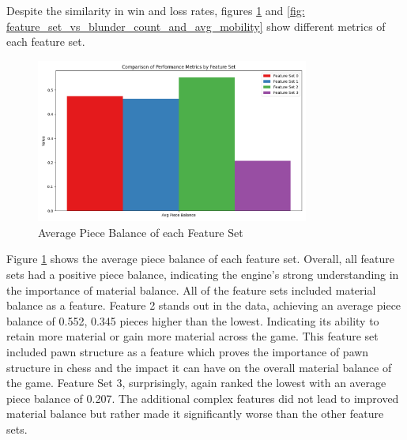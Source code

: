 Despite the similarity in win and loss rates, figures \ref{fig: feature_set_vs_piece_balance} and \ref{fig: feature_set_vs_blunder_count_and_avg_mobility} show different metrics of each feature set.







\begin{figure}[H]
    \centering
    \includegraphics[width=0.8\textwidth]{images/plots/featureSet/Feature_set_vs_piece_balance.png}
    \caption{Average Piece Balance of each Feature Set}
    \label{fig: feature_set_vs_piece_balance}
\end{figure}


Figure \ref{fig: feature_set_vs_piece_balance} shows the average piece balance of each feature set. Overall, all feature sets had a positive piece balance, indicating the engine's strong understanding in the importance of material balance. All of the feature sets included material balance as a feature. Feature 2 stands out in the data, achieving an average piece balance of 0.552, 0.345 pieces higher than the lowest. Indicating its ability to retain more material or gain more material across the game. This feature set included pawn structure as a feature which proves the importance of pawn structure in chess and the impact it can have on the overall material balance of the game. Feature Set 3, surprisingly, again ranked the lowest with an average piece balance of 0.207. The additional complex features did not lead to improved material balance but rather made it significantly worse than the other feature sets. 


